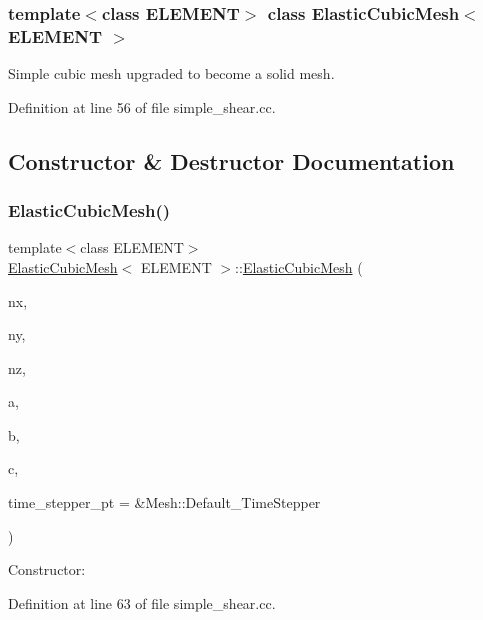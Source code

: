 \subsubsection*{template$<$class E\+L\+E\+M\+E\+NT$>$\newline
class Elastic\+Cubic\+Mesh$<$ E\+L\+E\+M\+E\+N\+T $>$}

Simple cubic mesh upgraded to become a solid mesh. 

Definition at line 56 of file simple\+\_\+shear.\+cc.



\subsection{Constructor \& Destructor Documentation}
\mbox{\label{classElasticCubicMesh_aa09317d23e99358728bd81d0c67410a4}} 
\subsubsection{\texorpdfstring{Elastic\+Cubic\+Mesh()}{ElasticCubicMesh()}}
{\footnotesize\ttfamily template$<$class E\+L\+E\+M\+E\+NT$>$ \\
\hyperlink{classElasticCubicMesh}{Elastic\+Cubic\+Mesh}$<$ E\+L\+E\+M\+E\+NT $>$\+::\hyperlink{classElasticCubicMesh}{Elastic\+Cubic\+Mesh} (\begin{DoxyParamCaption}\item[{const unsigned \&}]{nx,  }\item[{const unsigned \&}]{ny,  }\item[{const unsigned \&}]{nz,  }\item[{const double \&}]{a,  }\item[{const double \&}]{b,  }\item[{const double \&}]{c,  }\item[{Time\+Stepper $\ast$}]{time\+\_\+stepper\+\_\+pt = {\ttfamily \&Mesh\+:\+:Default\+\_\+TimeStepper} }\end{DoxyParamCaption})\hspace{0.3cm}{\ttfamily [inline]}}



Constructor\+: 



Definition at line 63 of file simple\+\_\+shear.\+cc.

